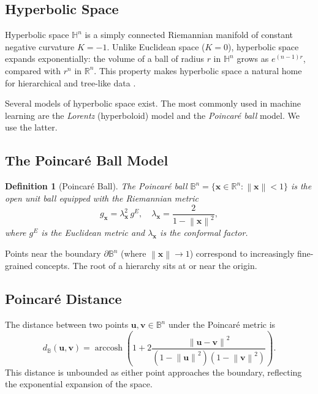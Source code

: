 \documentclass[12pt,a4paper]{article}
\newcommand{\R}{\mathbb{R}}
\newcommand{\ball}{\mathbb{B}}
\newcommand{\dist}{d_{\ball}}
\newcommand{\norm}[1]{\left\| #1 \right\|}
\newtheorem{definition}{Definition}
\begin{document}
\subsection{Hyperbolic Space}

Hyperbolic space $\mathbb{H}^n$ is a simply connected Riemannian manifold of constant negative curvature $K = -1$. Unlike Euclidean space ($K = 0$), hyperbolic space expands exponentially: the volume of a ball of radius $r$ in $\mathbb{H}^n$ grows as $e^{(n-1)r}$, compared with $r^n$ in $\R^n$. This property makes hyperbolic space a natural home for hierarchical and tree-like data \citep{hamber1891uber}.

Several models of hyperbolic space exist. The most commonly used in machine learning are the \emph{Lorentz} (hyperboloid) model and the \emph{Poincar\'e ball} model. We use the latter.

\subsection{The Poincar\'e Ball Model}

\begin{definition}[Poincar\'e Ball]
The Poincar\'e ball $\ball^n = \{ \mathbf{x} \in \R^n : \norm{\mathbf{x}} < 1 \}$ is the open unit ball equipped with the Riemannian metric
\begin{equation}
  g_{\mathbf{x}} = \lambda_{\mathbf{x}}^2 \, g^E, \quad \lambda_{\mathbf{x}} = \frac{2}{1 - \norm{\mathbf{x}}^2},
  \label{eq:conformal}
\end{equation}
where $g^E$ is the Euclidean metric and $\lambda_{\mathbf{x}}$ is the conformal factor.
\end{definition}

Points near the boundary $\partial\ball^n$ (where $\norm{\mathbf{x}} \to 1$) correspond to increasingly fine-grained concepts. The root of a hierarchy sits at or near the origin.

\subsection{Poincar\'e Distance}

The distance between two points $\mathbf{u}, \mathbf{v} \in \ball^n$ under the Poincar\'e metric is
\begin{equation}
  \dist(\mathbf{u}, \mathbf{v}) = \operatorname{arccosh}\!\left(1 + 2 \frac{\norm{\mathbf{u} - \mathbf{v}}^2}{(1 - \norm{\mathbf{u}}^2)(1 - \norm{\mathbf{v}}^2)}\right).
  \label{eq:poincare-distance}
\end{equation}
This distance is unbounded as either point approaches the boundary, reflecting the exponential expansion of the space.
\end{document}
